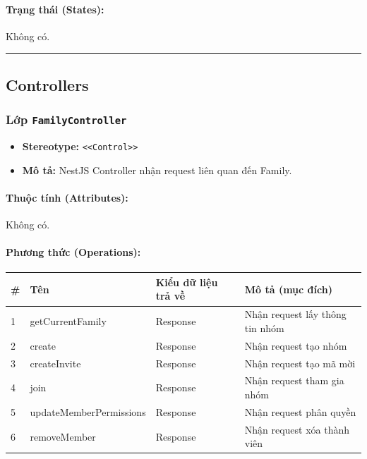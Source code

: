 \documentclass[12pt,a4paper]{article}
\begin{document}
\paragraph{Trạng thái (States):}
Không có.

\vskip 0.5cm
\noindent\rule{\textwidth}{0.5pt}
\vskip 0.5cm

\subsection{Controllers}


\subsubsection{Lớp \texttt{FamilyController}}

\begin{itemize}[leftmargin=*]
    \item \textbf{Stereotype:} \texttt{\textless{}\textless{}Control\textgreater{}\textgreater{}}
    \item \textbf{Mô tả:} NestJS Controller nhận request liên quan đến Family.
\end{itemize}

\paragraph{Thuộc tính (Attributes):}
Không có.

\paragraph{Phương thức (Operations):}
\begin{longtable}{|p{0.6cm}|p{5.0cm}|p{2.8cm}|p{5.4cm}|}
\hline
\textbf{\#} & \textbf{Tên} & \textbf{Kiểu dữ liệu trả về} & \textbf{Mô tả (mục đích)} \\ \hline
\endhead
1 & getCurrentFamily & Response & Nhận request lấy thông tin nhóm \\ \hline
2 & create & Response & Nhận request tạo nhóm \\ \hline
3 & createInvite & Response & Nhận request tạo mã mời \\ \hline
4 & join & Response & Nhận request tham gia nhóm \\ \hline
5 & updateMemberPermissions & Response & Nhận request phân quyền \\ \hline
6 & removeMember & Response & Nhận request xóa thành viên \\ \hline
\end{longtable}
\end{document}
